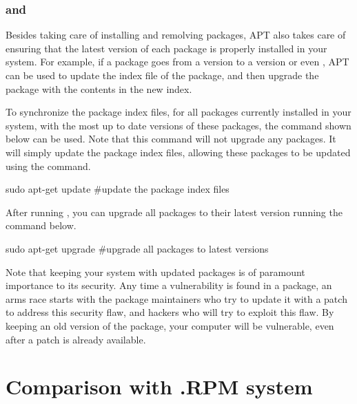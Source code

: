\subsubsection*{ and }

Besides taking care of installing and remolving packages, \acs{APT} also takes care of ensuring that the latest version of each package is properly installed in your system. For example, if a package goes from a version  to a version  or even , \acs{APT} can be used to update the index file of the package, and then upgrade the package with the contents in the new index. 

To synchronize the package index files, for all packages currently installed in your system, with the most up to date versions of these packages, the  command shown below can be used. Note that this command will not upgrade any packages. It will simply update the package index files, allowing these packages to be updated using the  command.

\begin{command_line}[make]
sudo apt-get update #update the package index files
\end{command_line}

After running , you can upgrade all packages to their latest version running the command below.

\begin{command_line}[make]
sudo apt-get upgrade #upgrade all packages to latest versions
\end{command_line}

Note that keeping your system with updated packages is of paramount importance to its security. Any time a vulnerability is found in a package, an arms race starts with the package maintainers who try to update it with a patch to address this security flaw, and hackers who will try to exploit this flaw. By keeping an old version of the package, your computer will be vulnerable, even after a patch is already available.


\section{Comparison with .RPM system}

